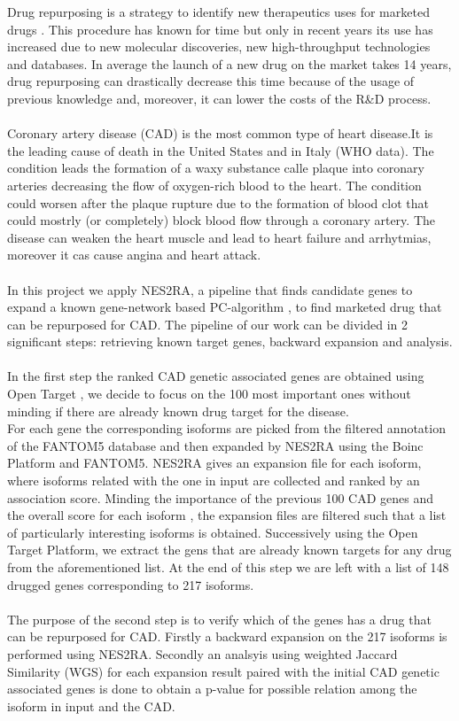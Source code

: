 \documentclass[fleqn,10pt]{SelfArx} %
\begin{document}
Drug repurposing is a strategy to identify new therapeutics uses for marketed drugs \cite{Polamreddy}. This procedure has known for time but only in recent years its use has increased due to new molecular discoveries, new high-throughput technologies and databases. In average the launch of a new drug on the market takes 14 years, drug repurposing can drastically decrease this time because of the usage of previous knowledge and, moreover, it can lower the costs of the R{\&}D process.\\
\\
Coronary artery disease (CAD) is the most common type of heart disease.It is the leading cause of death in the United States and in Italy (WHO data). The condition leads the formation of a waxy substance calle plaque into coronary arteries decreasing the flow of oxygen-rich blood to the heart. The condition could worsen after the plaque rupture due to the formation of blood clot that could mostrly (or completely) block blood flow through a coronary artery. The disease can weaken the heart muscle and lead to heart failure and arrhytmias, moreover it cas cause angina and heart attack.\\
\\
In this project we apply NES2RA\cite{NES2RA}, a pipeline that finds candidate genes to expand a known gene-network based PC-algorithm \cite{PC-alg}, to find marketed drug that can be repurposed for CAD. 
The pipeline of our work can be divided in 2 significant steps: retrieving known target genes, backward expansion and analysis.\\
\\
In the first step the ranked CAD genetic associated genes are obtained using Open Target \cite{OpenTargetPlatform}, we decide to focus on the 100 most important ones without minding if there are already known drug target for the disease.\\
For each gene the corresponding isoforms are picked from the filtered annotation of the FANTOM5 database \cite{fantom} and then expanded by NES2RA using the Boinc Platform \cite{realBoinc} and FANTOM5. NES2RA gives an expansion file for each isoform, where isoforms related with the one in input are collected and ranked by an association score. Minding the importance of the previous 100 CAD genes and the overall score for each isoform , the expansion files are filtered such that a list of particularly interesting isoforms is obtained. Successively using the Open Target Platform, we extract the gens that are already known targets for any drug from the aforementioned list. At the end of this step we are left with a list of 148 drugged genes corresponding to 217 isoforms.\\
\\
The purpose of the second step is to verify which of the genes has a drug that can be repurposed for CAD.
Firstly a backward expansion on the 217 isoforms is performed using NES2RA.
Secondly an analsyis using weighted Jaccard Similarity (WGS) \cite{WGS} for each expansion result paired with the initial CAD genetic associated genes is done to obtain a p-value for possible relation among the isoform in input and the CAD. 
\end{document}
